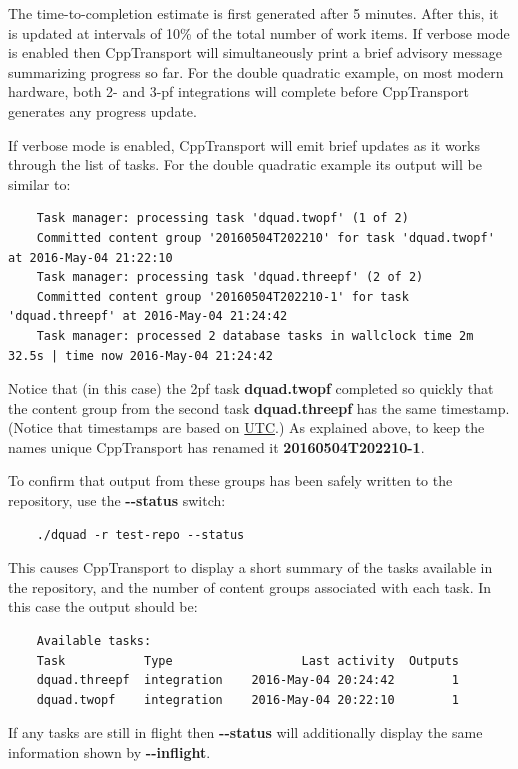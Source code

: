 \documentclass[11pt,a4paper]{article}
\newcommand{\repoobject}[1]{{\ttfamily\bfseries\small #1}}
\newcommand{\packagefont}{\sffamily}
\newcommand{\CppTransport}{{\packagefont CppTransport}}
\newcommand{\option}[1]{{\ttfamily\bfseries\small #1}}
\begin{document}
\begin{itemize}
    The time-to-completion estimate is first generated after 5 minutes.
    After this, it is updated at intervals of 10\% of the total number
    of work items.
    If verbose mode is enabled then {\CppTransport} will simultaneously
    print a brief advisory message summarizing progress so far.
    For the double quadratic example,
    on most modern hardware, both 2- and 3-pf integrations will complete
    before {\CppTransport} generates any progress update.
\end{itemize}
If verbose mode is enabled, {\CppTransport} will emit brief updates
as it works through the list of tasks.
For the double quadratic example its output will be similar to:
\begin{verbatim}
    Task manager: processing task 'dquad.twopf' (1 of 2)
    Committed content group '20160504T202210' for task 'dquad.twopf' at 2016-May-04 21:22:10
    Task manager: processing task 'dquad.threepf' (2 of 2)
    Committed content group '20160504T202210-1' for task 'dquad.threepf' at 2016-May-04 21:24:42
    Task manager: processed 2 database tasks in wallclock time 2m 32.5s | time now 2016-May-04 21:24:42
\end{verbatim}
Notice that (in this case) the 2pf task \repoobject{dquad.twopf} completed so quickly that
the content group from the second task
\repoobject{dquad.threepf}
has the same timestamp.
(Notice that timestamps are based on
\href{https://en.wikipedia.org/wiki/Coordinated_Universal_Time}{UTC}.)
As explained above, to keep the names unique {\CppTransport}
has renamed it
\repoobject{20160504T202210-1}.

To confirm that output from these groups has been safely written to the repository,
use the \option{{-}{-}status} switch:
\begin{verbatim}
    ./dquad -r test-repo --status    
\end{verbatim}
This causes {\CppTransport} to display a short summary of the tasks available
in the repository, and the number of content groups associated with each task.
In this case the output should be:
\begin{verbatim}
    Available tasks:
    Task           Type                  Last activity  Outputs
    dquad.threepf  integration    2016-May-04 20:24:42        1
    dquad.twopf    integration    2016-May-04 20:22:10        1
\end{verbatim}
If any tasks are still in flight then \option{{-}{-}status} will
additionally display the
same information shown by \option{{-}{-}inflight}.
\end{document}
